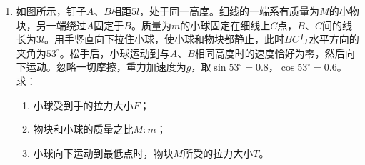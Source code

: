 \begin{enumerate}[leftmargin=0em]
\begin{enumerate}
\end{enumerate}




\item 
{}
如图所示，钉子$ A $、$ B $相距$ 5l $，处于同一高度。细线的一端系有质量为$ M $的小物块，另一端绕过$ A $固定于$ B $。质量为$ m $的小球固定在细线上$ C $点，$ B $、$ C $间的线长为$ 3l $。用手竖直向下拉住小球，使小球和物块都静止，此时$ BC $与水平方向的夹角为$ 53 ^{ \circ } $。松手后，小球运动到与$ A $、$ B $相同高度时的速度恰好为零，然后向下运动。忽略一切摩擦，重力加速度为$ g $，取$ \sin 53 ^{ \circ } =0.8 $，$ \cos 53 ^{ \circ } =0.6 $。求：
\begin{enumerate}
\renewcommand{\labelenumi}{\arabic{enumi}.}
\item
小球受到手的拉力大小$ F $；
\item 
物块和小球的质量之比$ M : m $；
\item 
小球向下运动到最低点时，物块$ M $所受的拉力大小$ T $。



\end{enumerate}
\begin{figure}[h!]
\flushright

\end{figure}

\end{enumerate}
